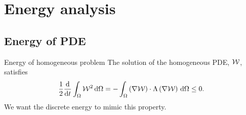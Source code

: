 \documentclass{beamer}
\begin{document}
\section{Energy analysis}
\subsection{Energy of PDE}
\begin{frame} {Energy of homogeneous problem}
    The solution of the homogeneous PDE, $\mathcal{W}$, satisfies
    \begin{equation*}
    \frac{1}{2} \frac{\mathrm{d}}{\mathrm{d} t} \int_{\Omega} \mathcal{W}^{2} \, \mathrm{d} \Omega
    = - \int_{\Omega} \left(\nabla \mathcal{W}\right) \cdot \Lambda \left(\nabla \mathcal{W} \right) \, \mathrm{d} \Omega
    \le 0.
    \end{equation*}
    We want the discrete energy to mimic this property.
\end{frame}
\end{document}
